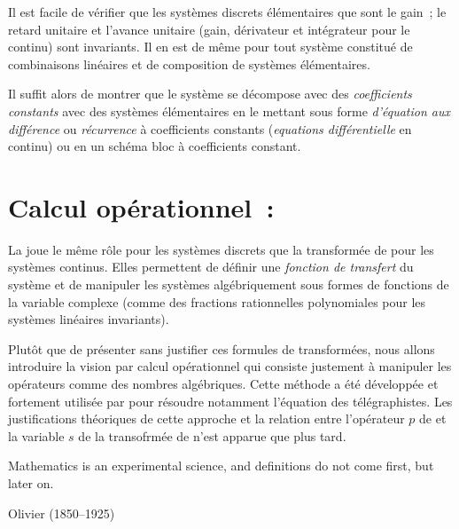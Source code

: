 \begin{remarque}
  Il est facile de vérifier que les systèmes discrets élémentaires que
  sont le gain~; le retard unitaire et l'avance unitaire (gain,
  dérivateur et intégrateur pour le continu) sont invariants.  Il en
  est de même pour tout système constitué de combinaisons linéaires
  et de composition de systèmes élémentaires.
  
  Il suffit alors de montrer que le système se décompose avec des
  \emph{coefficients constants} avec des systèmes élémentaires en le
  mettant sous forme \emph{d'équation aux différence} ou
  \emph{récurrence} à coefficients constants (\emph{equations
    différentielle} en continu) ou en un schéma bloc à coefficients
  constant.
\end{remarque}

\section{Calcul opérationnel~: \teZ{}}

La \teZ{} joue le même rôle pour les systèmes discrets que la
transformée de \Laplace{} pour les systèmes continus. Elles permettent
de définir une \emph{fonction de transfert} du système et de manipuler
les systèmes algébriquement sous formes de fonctions de la variable
complexe (comme des fractions rationnelles polynomiales pour les
systèmes linéaires invariants).

Plutôt que de présenter sans justifier ces formules de transformées,
nous allons introduire la vision par calcul opérationnel qui consiste
justement à manipuler les opérateurs comme des nombres
algébriques. Cette méthode a été développée et fortement utilisée par
\Heaviside{} pour résoudre notamment l'équation des
télégraphistes. Les justifications théoriques de cette approche et la
relation entre l'opérateur $p$ de \Heaviside{} et la variable $s$ de
la transofrmée de \Laplace{} n'est apparue que plus tard.

\begin{citations} Mathematics is an experimental science, and definitions do not come
  first, but later on.

  \hfill Olivier \Heaviside{} (1850--1925)
\end{citations}

